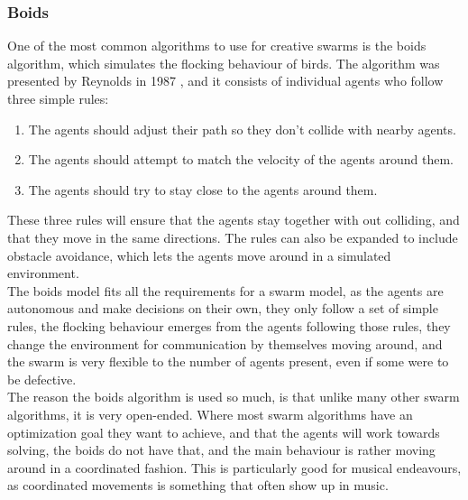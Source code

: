 \documentclass[a4paper,english]{report}
\begin{document}
	\subsubsection{Boids}
	One of the most common algorithms to use for creative swarms is the boids algorithm, which simulates the flocking behaviour of birds. The algorithm was presented by Reynolds in 1987 \cite{reynolds1987flocks}, and it consists of individual agents who follow three simple rules:
	\begin{enumerate}
		\item The agents should adjust their path so they don't collide with nearby agents.
		\item The agents should attempt to match the velocity of the agents around them.
		\item The agents should try to stay close to the agents around them.
	\end{enumerate}
	These three rules will ensure that the agents stay together with out colliding, and that they move in the same directions. The rules can also be expanded to include obstacle avoidance, which lets the agents move around in a simulated environment. \\
	The boids model fits all the requirements for a swarm model, as the agents are autonomous and make decisions on their own, they only follow a set of simple rules, the flocking behaviour emerges from the agents following those rules, they change the environment for communication by themselves moving around, and the swarm is very flexible to the number of agents present, even if some were to be defective.\\
	The reason the boids algorithm is used so much, is that unlike many other swarm algorithms, it is very open-ended. Where most swarm algorithms have an optimization goal they want to achieve, and that the agents will work towards solving, the boids do not have that, and the main behaviour is rather moving around in a coordinated fashion. This is particularly good for musical endeavours, as coordinated movements is something that often show up in music.\\
\end{document}
